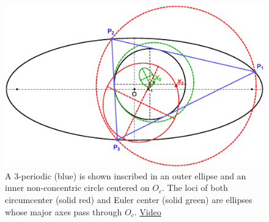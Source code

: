 \begin{figure}
    \centering
    \includegraphics[width=.7\textwidth]{pics/0100_n3_nonconcentric_circular_caustic.eps}
    \caption{A 3-periodic (blue) is shown inscribed in an outer ellipse and an inner non-concentric circle centered on $O_c$. The loci of both circumcenter (solid red) and Euler center (solid green) are ellipses whose major axes pass through $O_c$. \href{https://youtu.be/w7sZ5O8k4xU}{Video}}
    \label{fig:circular-caustic}
\end{figure}


